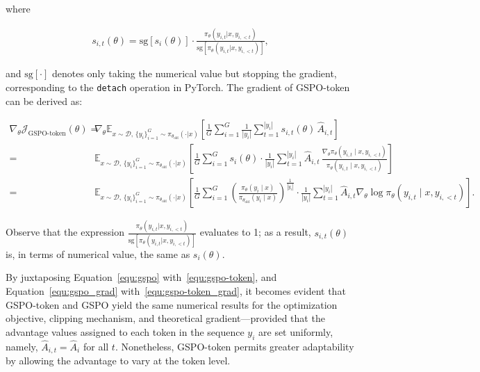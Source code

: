 where

\begin{align}
s_{i,t}(\theta) 
= \mathrm{sg} \left[ s_{i}(\theta) \right]  \cdot \frac{ \pi_{\theta} (y_{i,t} | x, y_{i,<t}) }{ \mathrm{sg} \left[ \pi_{\theta} (y_{i,t} | x, y_{i,<t}) \right] },
\end{align}

and $\mathrm{sg}[\cdot]$ denotes only taking the numerical value but stopping the gradient, corresponding to the \texttt{detach} operation in PyTorch. The gradient of GSPO-token can be derived as:

\begin{align}
\nabla_{\theta} \mathcal{J}_\text{GSPO-token}(\theta)
=&\
\nabla_{\theta} \mathbb{E}_{ x \sim \mathcal{D},\, \{y_i\}_{i=1}^G \sim \pi_{\theta_\text{old}}( \cdot | x) }
\left[
\frac{1}{G} \sum_{i=1}^{G}
\frac{1}{|y_i|} \sum_{t=1}^{|y_i|} 
s_{i,t}(\theta)\, \widehat{A}_{i,t}
\right] \\
=&\
\mathbb{E}_{ x \sim \mathcal{D},\, \{y_i\}_{i=1}^G \sim \pi_{\theta_\text{old}}( \cdot | x) }
\left[
\frac{1}{G} \sum_{i=1}^G s_i(\theta) \cdot \frac{1}{|y_i|} \sum_{t=1}^{|y_i|}
\widehat{A}_{i,t}\, \frac{\nabla_\theta \pi_\theta(y_{i,t} \mid x, y_{i,<t})}{\pi_\theta(y_{i,t} \mid x, y_{i,<t})}
\right] \\
=&\
\mathbb{E}_{ x \sim \mathcal{D},\, \{y_i\}_{i=1}^G \sim \pi_{\theta_\text{old}}( \cdot | x) }
\left[
\frac{1}{G} \sum_{i=1}^G \left( \frac{\pi_\theta(y_i \mid x)}{\pi_{\theta_\text{old}}(y_i \mid x)} \right)^{\frac{1}{|y_i|}}
\cdot \frac{1}{|y_i|} \sum_{t=1}^{|y_i|}
\widehat{A}_{i,t} \nabla_\theta \log \pi_\theta(y_{i,t} \mid x, y_{i,<t})
\right].
\label{equ:gspo-token_grad}
\end{align}

Observe that the expression $\frac{ \pi_{\theta} (y_{i,t} | x, y_{i,<t}) }{ \mathrm{sg} \left[ \pi_{\theta} (y_{i,t} | x, y_{i,<t}) \right] }$ evaluates to 1; as a result, $s_{i,t}(\theta)$ is, in terms of numerical value, the same as $s_{i}(\theta)$.

By juxtaposing Equation~\eqref{equ:gspo} with~\eqref{equ:gspo-token}, and Equation~\eqref{equ:gspo_grad} with~\eqref{equ:gspo-token_grad}, it becomes evident that GSPO-token and GSPO yield the same numerical results for the optimization objective, clipping mechanism, and theoretical gradient—provided that the advantage values assigned to each token in the sequence $y_i$ are set uniformly, namely, $\widehat{A}_{i,t} = \widehat{A}_{i}$ for all $t$. Nonetheless, GSPO-token permits greater adaptability by allowing the advantage to vary at the token level.

